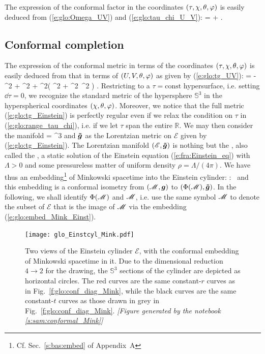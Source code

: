 The expression of the conformal factor in the
coordinates $(\tau,\chi,\theta,\varphi)$ is easily deduced from
(\ref{e:glo:Omega_UV}) and
(\ref{e:glo:tau_chi_U_V}):
\be \label{e:glo:Omega_tau_chi}
    \Omega = \cos\tau + \cos\chi .
\ee


\subsection{Conformal completion} \label{s:glo:conf_complet_Mink}

The expression of the conformal metric in terms of the coordinates
$(\tau,\chi,\theta,\varphi)$ is easily deduced from that in terms of
$(U,V,\theta,\varphi)$ as given by (\ref{e:glo:tg_UV}):
\be \label{e:glo:tg_Einstein}
     =  - \dd\tau^2
        + \dd \chi^2
        + \sin^2\chi \left(  \dd\th^2 + \sin^2\th \, \dd\ph^2 \right) .
\ee
Restricting to a $\tau = \mathrm{const}$ hypersurface, i.e. setting $\dd\tau=0$,
we recognize the standard metric of the hypersphere
$\mathbb{S}^3$ in the hyperspherical coordinates $(\chi,\theta,\varphi)$.
Moreover, we notice that the full metric (\ref{e:glo:tg_Einstein})
is perfectly regular even if we relax
the condition on $\tau$ in (\ref{e:glo:range_tau_chi}), i.e. if we
let $\tau$ span the
entire $\mathbb{R}$. We may then consider the manifold
\be
     = \times {}^3
\ee
and $\bm{\tilde{g}}$ as the Lorentzian metric on $\mathscr{E}$ given by
(\ref{e:glo:tg_Einstein}).
The Lorentzian manifold
$(\mathscr{E},\bm{\tilde{g}})$ is nothing but the
, also called the ,
a static solution of the Einstein equation (\ref{e:fra:Einstein_eq})
with $\Lambda > 0$ and some pressureless matter of uniform density
$\rho = \Lambda/(4\pi)$.
We have thus an embedding\footnote{Cf. Sec.~\ref{s:bas:embed} of Appendix~A} of Minkowski spacetime into the Einstein cylinder:
\be \label{e:glo:embed_Mink_Einst}
     \Phi:\ \M \longrightarrow {}
\ee
and this embedding is a conformal isometry from
$(\mathscr{M},\bm{g})$ to $(\Phi(\mathscr{M}),\bm{\tilde{g}})$.
In the following, we shall identify $\Phi(\mathscr{M})$ and $\mathscr{M}$, i.e. use the same
symbol $\mathscr{M}$ to denote the subset of $\mathscr{E}$ that is the image of $\mathscr{M}$ via the
embedding (\ref{e:glo:embed_Mink_Einst}).

\begin{figure}
\centerline{\texttt{[image: glo\_Einstcyl\_Mink.pdf]}}
\caption[]{\label{f:glo:Einstcyl_Mink}\footnotesize
Two views of the Einstein cylinder $\mathscr{E}$, with the conformal embedding of
Minkowski spacetime in it. Due to the dimensional reduction $4 \to 2$ for
the drawing, the
$\mathbb{S}^3$ sections of the cylinder are depicted as horizontal circles.
The red curves are the same constant-$r$ curves
as in Fig.~\ref{f:glo:conf_diag_Mink}, while the black curves are
the same constant-$t$ curves as those drawn in grey in Fig.~\ref{f:glo:conf_diag_Mink}.
\textsl{[Figure generated by the notebook \ref{s:sam:conformal_Mink}]}
}
\end{figure}

